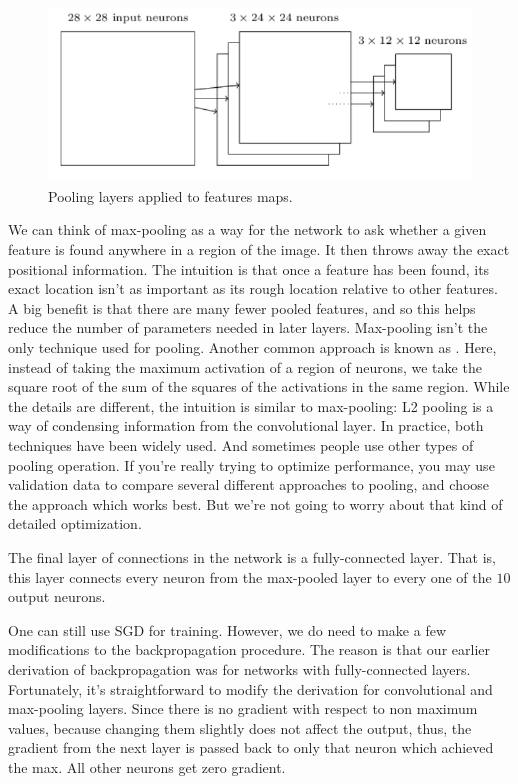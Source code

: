 \begin{figure}
\centering
\includegraphics[scale=0.5]{img/CNN7}
\caption{Pooling layers applied to features maps.}
\label{fig:CNN7}
\end{figure}
We can think of max-pooling as a way for the network to ask whether a given feature is found anywhere in a region of the image. It then throws away the exact positional information. The intuition is that once a feature has been found, its exact location isn't as important as its rough location relative to other features. A big benefit is that there are many fewer pooled features, and so this helps reduce the number of parameters needed in later layers. Max-pooling isn't the only technique used for pooling. Another common approach is known as . Here, instead of taking the maximum activation of a region of neurons, we take the square root of the sum of the squares of the activations in the same region. While the details are different, the intuition is similar to max-pooling: L2 pooling is a way of condensing information from the convolutional layer. In practice, both techniques have been widely used. And sometimes people use other types of pooling operation. If you're really trying to optimize performance, you may use validation data to compare several different approaches to pooling, and choose the approach which works best. But we're not going to worry about that kind of detailed optimization. 

The final layer of connections in the network is a fully-connected layer. That is, this layer connects every neuron from the max-pooled layer to every one of the $10$ output neurons.

One can still use SGD for training. However, we do need to make a few modifications to the backpropagation procedure. The reason is that our earlier derivation of backpropagation was for networks with fully-connected layers. Fortunately, it's straightforward to modify the derivation for convolutional and max-pooling layers. Since there is no gradient with respect to non maximum values, because changing them slightly does not affect the output, thus, the gradient from the next layer is passed back to only that neuron which achieved the max.  All other neurons get zero gradient.


